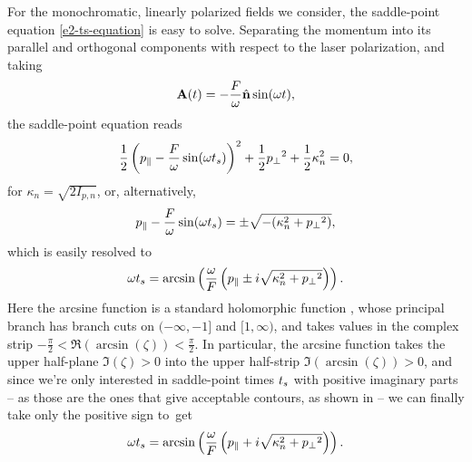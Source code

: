 For the monochromatic, linearly polarized fields we consider, the saddle-point equation \eqref{e2-ts-equation} is easy to solve. Separating the momentum into its parallel and orthogonal components with respect to the laser polarization, and taking 
\begin{equation}
\vb{A}(t)=-\frac{F}{\omega}\hat{\vb{n}} \sin(\omega t),
\label{e2-field-definition}
\end{equation}
the saddle-point equation reads
\begin{equation}
\frac{1}{2} \left({p_{\parallel}} -\frac{F}{\omega}\sin(\omega {t_s}) \right)^2 +\frac{1}{2}{p_{\perp}}^2 + \frac 12 \kappa_n^2=0,
\end{equation}
for $\kappa_n=\sqrt{2I_{p,n}}$, or, alternatively,
\begin{equation}
{p_{\parallel}} -\frac{F}{\omega}\sin(\omega {t_s})
=\pm\sqrt{-(\kappa_n^2+{p_{\perp}}^2)},
\end{equation}
which is easily resolved to 
\begin{equation}
\omega {t_s}
= \arcsin\left(
\frac{\omega}{F}\left({p_{\parallel}}\pm i \sqrt{\kappa_n^2+{p_{\perp}}^2}\right)
\right).
\end{equation}
Here the arcsine function is a standard holomorphic function , whose principal branch has branch cuts on $(-\infty,-1]$ and $[1,\infty)$, and takes values in the complex strip $-\frac{\pi}{2}<\Re(\arcsin(\zeta))<\frac{\pi}{2}$. In particular, the arcsine function takes the upper half-plane $\Im(\zeta)>0$ into the upper half-strip $\Im(\arcsin(\zeta))>0$, and since we're only interested in saddle-point times ${t_s}$ with positive imaginary parts -- as those are the ones that give acceptable contours, as shown in  -- we can finally take only the positive sign to~get
\begin{equation}
\omega {t_s}
= \arcsin\left(
\frac{\omega}{F}\left({p_{\parallel}} + i \sqrt{\kappa_n^2+{p_{\perp}}^2}\right)
\right).
\label{e2-saddle-point-equation-final-solution}
\end{equation}


